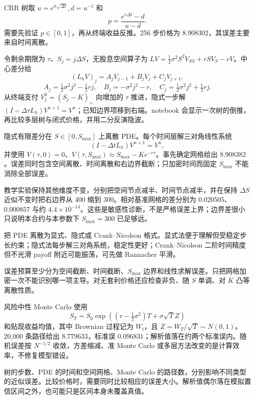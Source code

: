CRR 树取 $u=e^{\sigma\sqrt{\Delta t}},d=u^{-1}$ 和
\[
 p=\frac{e^{r\Delta t}-d}{u-d}.
\]
需要先验证 $p\in[0,1]$，再从终端收益反推。256 步价格为 $8.908302$，其误差主要来自时间离散\cite{cox1979option}。


令剩余期限为 $\tau$、$S_j=j\Delta S$，无股息空间算子为 $LV=\tfrac12\sigma^2S^2V_{SS}+rSV_S-rV$。中心差分给
\[
 (L_hV)_j=A_jV_{j-1}+B_jV_j+C_jV_{j+1},
\]
\[
 A_j=\tfrac12\sigma^2j^2-\tfrac12rj,\quad
 B_j=-\sigma^2j^2-r,\quad
 C_j=\tfrac12\sigma^2j^2+\tfrac12rj.
\]
从终端支付 $V_j^0=(S_j-K)_+$ 向增加的 $\tau$ 推进，隐式一步解 $(I-\Delta\tau L_h)V^{n+1}=V^n$；已知边界项移到右端。notebook 会显示一次树的倒推，再比较多层树与闭式价格，并用二分反演隐波。

隐式有限差分在 $S\in[0,S_{\max}]$ 上离散 PDE。每个时间层解三对角线性系统
\[
 (I-\Delta t L_h)V^{n+1}=V^n,
\]
并使用 $V(\tau,0)=0$、$V(\tau,S_{\max})\approx S_{\max}-Ke^{-r\tau}$。事先确定网格给出 $8.908382$。误差同时包含空间离散、时间离散和右边界截断；只加密时间而固定 $S_{\max}$ 不能消除全部误差。

教学实验保持其他维度不变，分别把空间节点减半、时间节点减半，并在保持 $\Delta S$ 近似不变时把右边界从 $400$ 缩到 $300$。相对基准网格的差分别为 $0.020505$、$0.000857$ 与约 $4.4\times10^{-14}$。这些是敏感性诊断，不是严格误差上界；边界差很小只说明本合约与本参数下 $S_{\max}=300$ 已足够远。


把 PDE 离散为显式、隐式或 Crank--Nicolson 格式。显式法便于理解但受稳定步长约束；隐式法每步解三对角系统，稳定性更好；Crank--Nicolson 二阶时间精度但不光滑 payoff 附近可能振荡，可先做 Rannacher 平滑。



误差预算至少分为空间截断、时间截断、$S_{\max}$ 边界和线性求解误差。只把网格加密一次不能识别哪一项主导。对无套利价格还应检查非负、随 $S$ 单调、对 $K$ 凸等离散性质。

风险中性 Monte Carlo 使用
\[
 S_T=S_0\exp\left((r-\tfrac12\sigma^2)T+\sigma\sqrt T Z\right)
\]
和贴现收益均值，其中 Brownian 过程记为 $W_t$，且 $Z=W_T/\sqrt T\sim N(0,1)$。20,000 条路径给出 $8.779633$，标准误 $0.096831$；解析值落在约两个标准误内。随机误差按 $N^{-1/2}$ 收敛，方差缩减、准 Monte Carlo 或多层方法改变的是计算效率，不修复模型错设\cite{glasserman2004montecarlo}。

树的步数、PDE 的时间和空间网格、Monte Carlo 的路径数，分别影响不同类型的近似误差。比较价格时，需要同时比较相应的误差大小。解析值偶尔落在模拟置信区间之外，也可能只是区间本身未覆盖真值。

